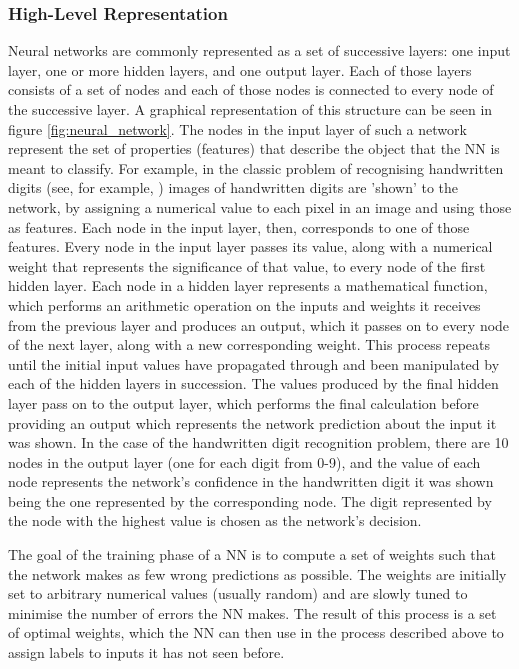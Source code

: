 \subsubsection{High-Level Representation}
Neural networks are commonly represented as a set of successive layers: one input layer, one or more hidden layers, and one output layer. Each of those layers consists of a set of nodes and each of those nodes is connected to every node of the successive layer. A graphical representation of this structure can be seen in figure \ref{fig:neural_network}. The nodes in the input layer of such a network represent the set of properties (features) that describe the object that the NN is meant to classify. For example, in the classic problem of recognising handwritten digits (see, for example, \cite{handwritten}) images of handwritten digits are 'shown' to the network, by assigning a numerical value to each pixel in an image and using those as features. Each node in the input layer, then, corresponds to one of those features. Every node in the input layer passes its value, along with a numerical weight that represents the significance of that value, to every node of the first hidden layer. Each node in a hidden layer represents a mathematical function, which performs an arithmetic operation on the inputs and weights it receives from the previous layer and produces an output, which it passes on to every node of the next layer, along with a new corresponding weight. This process repeats until the initial input values have propagated through and been manipulated by each of the hidden layers in succession. The values produced by the final hidden layer pass on to the output layer, which performs the final calculation before providing an output which represents the network prediction about the input it was shown. In the case of the handwritten digit recognition problem, there are 10 nodes in the output layer (one for each digit from 0-9), and the value of each node represents the network's confidence in the handwritten digit it was shown being the one represented by the corresponding node. The digit represented by the node with the highest value is chosen as the network's decision.

The goal of the training phase of a NN is to compute a set of weights such that the network makes as few wrong predictions as possible. The weights are initially set to arbitrary numerical values (usually random) and are slowly tuned to minimise the number of errors the NN makes. The result of this process is a set of optimal weights, which the NN can then use in the process described above to assign labels to inputs it has not seen before.

